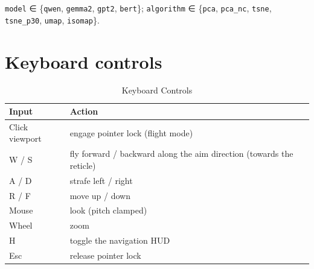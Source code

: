 \documentclass[conference,a4paper]{IEEEtran}
\begin{document}
\texttt{model} ∈ \{\texttt{qwen}, \texttt{gemma2}, \texttt{gpt2},
\texttt{bert}\}; \texttt{algorithm} ∈ \{\texttt{pca}, \texttt{pca\_nc},
\texttt{tsne}, \texttt{tsne\_p30}, \texttt{umap}, \texttt{isomap}\}.

\section{Keyboard controls}\label{sec:app-keyboard}

\begin{table}[tp]
\centering
\caption{Keyboard Controls}\label{tab:keyboard-controls}
\footnotesize
\begin{tabularx}{\columnwidth}{l>{\raggedright\arraybackslash}X}
\toprule
Input & Action \\
\midrule
Click viewport & engage pointer lock (flight mode) \\
W / S & fly forward / backward along the aim direction (towards the reticle) \\
A / D & strafe left / right \\
R / F & move up / down \\
Mouse & look (pitch clamped) \\
Wheel & zoom \\
H & toggle the navigation HUD \\
Esc & release pointer lock \\
\bottomrule
\end{tabularx}
\end{table}
\end{document}

